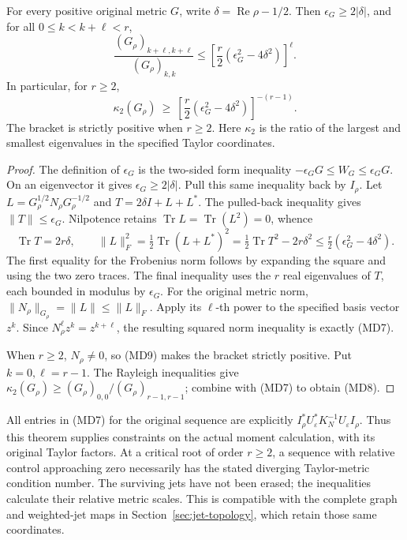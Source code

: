 \begin{theorem}
For every positive original metric \(G\), write
\(\delta=\operatorname{Re}\rho-1/2\). Then
\(\epsilon_G\geq2|\delta|\), and for all
\(0\leq k<k+\ell<r\),
\[
 \frac{(G_\rho)_{k+\ell,k+\ell}}{(G_\rho)_{k,k}}
 \leq \left[\frac r2(\epsilon_G^2-4\delta^2)\right]^\ell.
 \tag{MD7}
\]
In particular, for \(r\geq2\),
\[
 \kappa_2(G_\rho)\ \geq\
 \left[\frac r2(\epsilon_G^2-4\delta^2)\right]^{-(r-1)} .
 \tag{MD8}
\]
The bracket is strictly positive when \(r\geq2\).
Here \(\kappa_2\) is the ratio of the largest and smallest
eigenvalues in the specified Taylor coordinates.
\end{theorem}
\begin{proof}
The definition of \(\epsilon_G\) is the two-sided form inequality
\(-\epsilon_GG\leq W_G\leq\epsilon_GG\).
On an eigenvector it gives \(\epsilon_G\geq2|\delta|\).
Pull this same inequality back by \(I_\rho\). Let
\(L=G_\rho^{1/2}N_\rho G_\rho^{-1/2}\) and
\(T=2\delta I+L+L^*\). The pulled-back inequality gives
\(\|T\|\leq\epsilon_G\). Nilpotence retains
\(\operatorname{Tr}L=\operatorname{Tr}(L^2)=0\), whence
\[
 \operatorname{Tr}T=2r\delta,\qquad
 \|L\|_F^2=\tfrac12\operatorname{Tr}(L+L^*)^2
       =\tfrac12\operatorname{Tr}T^2-2r\delta^2
       \leq\tfrac r2(\epsilon_G^2-4\delta^2).
 \tag{MD9}
\]
The first equality for the Frobenius norm follows by expanding
the square and using the two zero traces. The final inequality
uses the \(r\) real eigenvalues of \(T\), each bounded in modulus
by \(\epsilon_G\). For the original metric norm,
\(\|N_\rho\|_{G_\rho}=\|L\|\leq\|L\|_F\).
Apply its \(\ell\)-th power to the specified basis vector \(z^k\).
Since \(N_\rho^\ell z^k=z^{k+\ell}\), the resulting squared
norm inequality is exactly (MD7).

When \(r\geq2\), \(N_\rho\neq0\), so (MD9) makes the bracket
strictly positive. Put \(k=0,\ell=r-1\). The Rayleigh inequalities
give
\(\kappa_2(G_\rho)\geq (G_\rho)_{0,0}/
(G_\rho)_{r-1,r-1}\); combine with (MD7) to obtain (MD8).
\end{proof}

All entries in (MD7) for the original sequence are explicitly
\(I_\rho^*U_\varepsilon^*K_N^{-1}U_\varepsilon I_\rho\).
Thus this theorem supplies constraints on the actual moment
calculation, with its original Taylor factors. At a critical root
of order \(r\geq2\), a sequence with relative control approaching
zero necessarily has the stated diverging Taylor-metric condition
number. The surviving jets have not been erased; the inequalities
calculate their relative metric scales. This is compatible with
the complete graph and weighted-jet maps in
Section~\ref{sec:jet-topology}, which retain those same coordinates.
